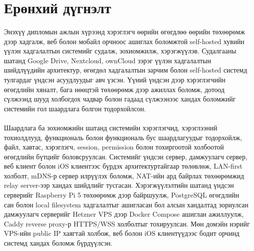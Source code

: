 
{}
\label{Summary} %
\section*{Ерөнхий дүгнэлт}



\paragraph{}
Энэхүү дипломын ажлын хүрээнд хэрэглэгч өөрийн өгөгдлөө өөрийн төхөөрөмж дээр хадгалж, веб болон мобайл орчноос ашиглах боломжтой self-hosted хувийн үүлэн хадгалалтын системийг судалж, зохиомжилж, хэрэгжүүлэв. Судалгааны шатанд Google Drive, Nextcloud, ownCloud зэрэг үүлэн хадгалалтын шийдлүүдийн архитектур, өгөгдөл хадгалалтын зарчим болон self-hosted системд тулгардаг үндсэн асуудлуудыг авч үзсэн. Үүний үндсэн дээр хэрэглэгчийн өгөгдлийн хяналт, бага нөөцтэй төхөөрөмж дээр ажиллах боломж, дотоод сүлжээнд шууд холбогдох чадвар болон гадаад сүлжээнээс хандах боломжийг системийн гол шаардлага болгон тодорхойлсон.

\paragraph{}
Шаардлага ба зохиомжийн шатанд системийн хэрэглэгчид, хэрэглээний тохиолдлууд, функциональ болон функциональ бус шаардлагуудыг тодорхойлж, файл, хавтас, хэрэглэгч, session, permission болон тохиргоотой холбоотой өгөгдлийн бүтцийг боловсруулсан. Системийг үндсэн сервер, дамжуулагч сервер, веб клиент болон iOS клиентээс бүрдэх архитектуртайгаар төлөвлөж, LAN-first холболт, mDNS-р сервер илрүүлэх боломж, NAT-ийн ард байрлах төхөөрөмжид relay server-ээр хандах шийдлийг тусгасан. Хэрэгжүүлэлтийн шатанд үндсэн серверийг Raspberry Pi 5 төхөөрөмж дээр байршуулж, PostgreSQL өгөгдлийн сан болон local filesystem хадгалалтыг ашигласан бол алсын хандалтад зориулсан дамжуулагч серверийг Hetzner VPS дээр Docker Compose ашиглан ажиллуулж, Caddy reverse proxy-р HTTPS/WSS холболтыг тохируулсан. Мөн домэйн нэрийг VPS-ийн public IP хаягтай холбож, веб болон iOS клиентүүдээс бодит орчинд системд хандах боломж бүрдүүлсэн.

